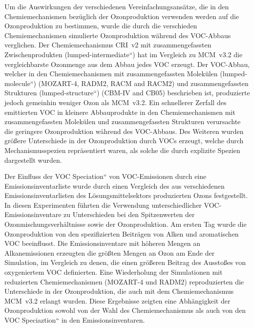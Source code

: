 Um die Auswirkungen der verschiedenen Vereinfachungsansätze, die in den Chemiemechanismen bezüglich der Ozonproduktion verwenden werden auf die Ozonproduktion zu bestimmen, wurde die durch die verschieden Chemiemechanismen simulierte Ozonproduktion während des VOC-Abbaus verglichen.
Der Chemiemechanismus CRI~v2 mit zusammengefassten Zwischenprodukten (\quotedblbase lumped-intermediate``) hat im Vergleich zu  MCM~v3.2 die vergleichbarste Ozonmenge aus dem Abbau jedes VOC erzeugt. 
Der VOC-Abbau, welcher in den Chemiemechanismen mit zusammengefassten Molekülen (\quotedblbase lumped-molecule``) (MOZART-4, RADM2, RACM and RACM2) und zusammengefassten Strukturen (\quotedblbase lumped-structure``) (CBM-IV and CB05) beschrieben ist, produzierte jedoch gemeinhin weniger Ozon als MCM~v3.2. 
Ein schnellerer Zerfall des emittierten VOC in kleinere Abbauprodukte in den Chemiemechanismen mit zusammengefassten Molekülen und zusammengefassten Strukturen verursachte die geringere Ozonproduktion während des VOC-Abbaus. 
Des Weiteren wurden größere Unterschiede in der Ozonproduktion durch VOCs erzeugt, welche durch Mechanismusspezien repräsentiert waren, als solche die durch explizite Spezien dargestellt wurden.

Der Einfluss der \quotedblbase VOC Speciation`` von VOC-Emissionen durch eine Emissionsinventarliste wurde durch einen Vergleich des aus verschiedenen Emissionsinventarlisten des Lösungsmittelsektors produzierten Ozons festgestellt.
In diesen Experimenten führten die Verwendung unterschiedlicher VOC-Emissionsinventare zu Unterschieden bei den Spitzenwerten der Ozonmischungsverhältnisse sowie der Ozonproduktion.
Am ersten Tag wurde die Ozonproduktion von den spezifizierten Beiträgen von Alken und aromatischen VOC beeinflusst.
Die Emissionsinventare mit höheren Mengen an Alkanemissionen erzeugten die größten Mengen an Ozon am Ende der Simulation, im Vergleich zu denen, die einen größeren Beitrag des Ausstoßes von oxygeniertem VOC definierten.
Eine Wiederholung der Simulationen mit reduzierten Chemiemechanismen (MOZART-4 und RADM2) reproduzierten die Unterschiede in der Ozonproduktion, die auch mit dem Chemiemechanismus MCM~v3.2 erlangt wurden.
Diese Ergebnisse zeigten eine Abhängigkeit der Ozonproduktion sowohl von der Wahl des Chemiemechanismus als auch von den \quotedblbase VOC Speciaztion`` in den Emissionsinventaren.

